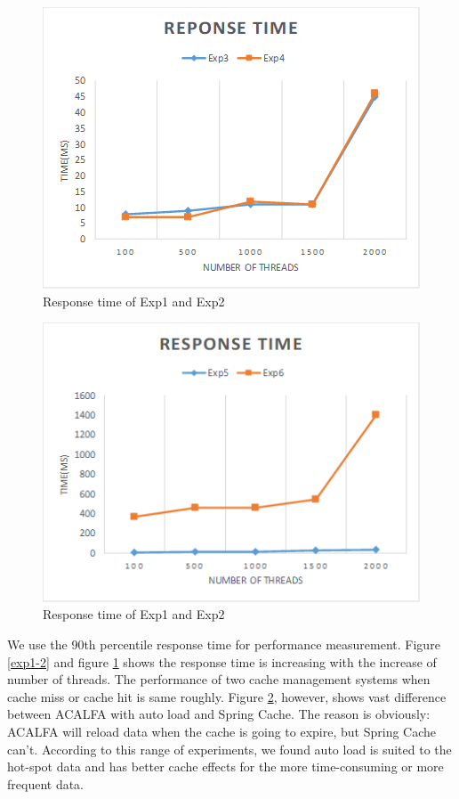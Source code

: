 \documentclass{singlecol-new}
\theoremstyle{TH}{
\newtheorem{lemma}{Lemma}
\newtheorem{theorem}[lemma]{Theorem}
\newtheorem{corrolary}[lemma]{Corrolary}
\newtheorem{conjecture}[lemma]{Conjecture}
\newtheorem{proposition}[lemma]{Proposition}
\newtheorem{claim}[lemma]{Claim}
\newtheorem{stheorem}[lemma]{Wrong Theorem}
}
\theoremstyle{THrm}{
\newtheorem{definition}{Definition}[section]
\newtheorem{question}{Question}[section]
\newtheorem{remark}{Remark}
\newtheorem{scheme}{Scheme}
}
\theoremstyle{THhit}{
\newtheorem{case}{Case}[section]
}
\begin{document}
\begin{figure} [htb]
    \centering
    \includegraphics[width=1\linewidth]{img/exp3-4.png}
    \caption{Response time of Exp1 and Exp2}
    \label{exp3-4}
\end{figure}

\begin{figure} [htb]
    \centering
    \includegraphics[width=1\linewidth]{img/exp5-6.png}
    \caption{Response time of Exp1 and Exp2}
    \label{exp5-6}
\end{figure}

We use the 90th percentile response time for performance measurement. Figure \ref{exp1-2} and figure \ref{exp3-4} shows the response time is increasing with the increase of number of threads. The performance of two cache management systems when cache miss or cache hit is same roughly. Figure \ref{exp5-6}, however, shows vast difference between ACALFA with auto load and Spring Cache. The reason is obviously: ACALFA will reload data when the cache is going to expire, but Spring Cache can't. According to this range of experiments, we found auto load is suited to the hot-spot data and has better cache effects for the more time-consuming or more frequent data.
\end{document}

